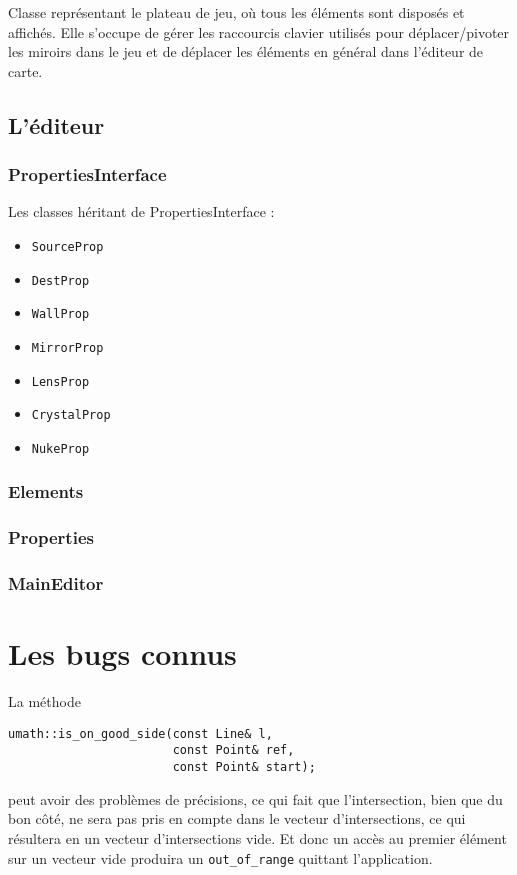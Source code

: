 \documentclass[]{article}
\begin{document}
Classe représentant le plateau de jeu, où tous les éléments sont disposés et affichés.
Elle s’occupe de gérer les raccourcis clavier utilisés pour déplacer/pivoter les miroirs dans le jeu et de déplacer les éléments en général dans l’éditeur de carte.

\subsection{\label{EditeurClasses}L'éditeur}

\subsubsection{PropertiesInterface}

Les classes héritant de PropertiesInterface :

\begin{itemize}
    \item \texttt{SourceProp}
    \item \texttt{DestProp}
    \item \texttt{WallProp}
    \item \texttt{MirrorProp}
    \item \texttt{LensProp}
    \item \texttt{CrystalProp}
    \item \texttt{NukeProp}
\end{itemize}

\subsubsection{Elements}
\subsubsection{Properties}
\subsubsection{MainEditor}

\section{Les bugs connus}

La méthode 
\begin{lstlisting}
umath::is_on_good_side(const Line& l, 
                       const Point& ref,
                       const Point& start);
\end{lstlisting}
peut avoir des problèmes de précisions, ce qui fait que l'intersection, bien que du bon côté, ne sera pas 
pris en compte dans le vecteur d'intersections, ce qui résultera en un vecteur d'intersections vide. Et donc un
accès au premier élément sur un vecteur vide produira un \texttt{out\_of\_range} quittant l'application.
\end{document}
